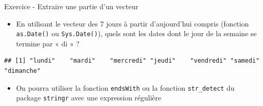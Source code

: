 \documentclass[
  ignorenonframetext,
]{beamer}
\providecommand{\tightlist}{%
  \setlength{\itemsep}{0pt}\setlength{\parskip}{0pt}}
\begin{document}
\begin{frame}[fragile]{Exercice - Extraire une partie d'un vecteur}
\protect\hypertarget{exercice---extraire-une-partie-dun-vecteur}{}
\begin{itemize}
\tightlist
\item
  En utilisant le vecteur des 7 jours à partir d'aujourd'hui compris
  (fonction \texttt{as.Date()} ou \texttt{Sys.Date()}), quels sont les
  dates dont le jour de la semaine se termine par « di » ?
\end{itemize}

\tiny

\begin{verbatim}
## [1] "lundi"    "mardi"    "mercredi" "jeudi"    "vendredi" "samedi"   "dimanche"
\end{verbatim}

\normalsize

\begin{itemize}
\tightlist
\item
  On pourra utiliser la fonction \texttt{endsWith} ou la fonction
  \texttt{str\_detect} du package \texttt{stringr} avec une expression
  régulière
\end{itemize}
\end{frame}
\end{document}
